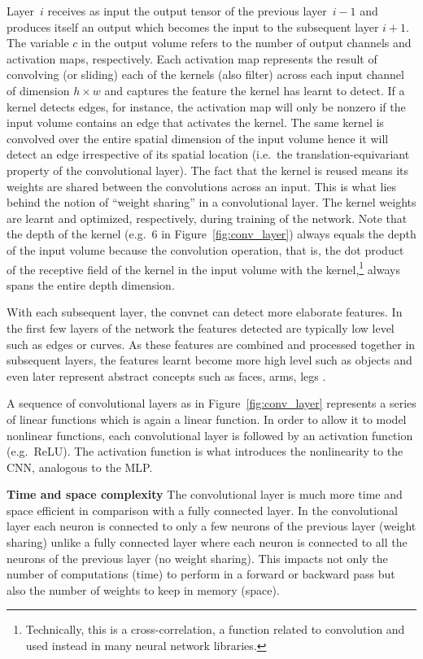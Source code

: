 \documentclass[a4paper,12pt]{report}
\begin{document}
Layer~$i$ receives as input the output tensor of the previous layer~$i-1$ and produces itself an output which becomes the input to the subsequent layer $i+1$. The variable $c$ in the output volume refers to the number of output channels and activation maps, respectively. Each activation map represents the result of convolving (or sliding) each of the kernels (also filter) across each input channel of dimension $h \times w$ and captures the feature the kernel has learnt to detect. If a kernel detects edges, for instance, the activation map will only be nonzero if the input volume contains an edge that activates the kernel. The same kernel is convolved over the entire spatial dimension of the input volume hence it will detect an edge irrespective of its spatial location (i.e.\ the translation-equivariant property of the convolutional layer). The fact that the kernel is reused means its weights are shared between the convolutions across an input. This is what lies behind the notion of ``weight sharing'' in a convolutional layer. The kernel weights are learnt and optimized, respectively, during training of the network. Note that the depth of the kernel (e.g.\ 6 in Figure~\ref{fig:conv_layer}) always equals the depth of the input volume because the convolution operation, that is, the dot product of the receptive field of the kernel in the input volume with the kernel,\footnote{Technically, this is a cross-correlation, a function related to convolution and used instead in many neural network libraries.} always spans the entire depth dimension.

With each subsequent layer, the convnet can detect more elaborate features. In the first few layers of the network the features detected are typically low level such as edges or curves. As these features are combined and processed together in subsequent layers, the features learnt become more high level such as objects and even later represent abstract concepts such as faces, arms, legs \cite{DeepVis}.

A sequence of convolutional layers as in Figure~\ref{fig:conv_layer} represents a series of linear functions which is again a linear function. In order to allow it to model nonlinear functions, each convolutional layer is followed by an activation function (e.g.\ ReLU). The activation function is what introduces the nonlinearity to the CNN, analogous to the MLP.

\textbf{Time and space complexity} The convolutional layer is much more time and space efficient in comparison with a fully connected layer. In the convolutional layer each neuron is connected to only a few neurons of the previous layer (weight sharing) unlike a fully connected layer where each neuron is connected to all the neurons of the previous layer (no weight sharing). This impacts not only the number of computations (time) to perform in a forward or backward pass but also the number of weights to keep in memory (space).
\end{document}
